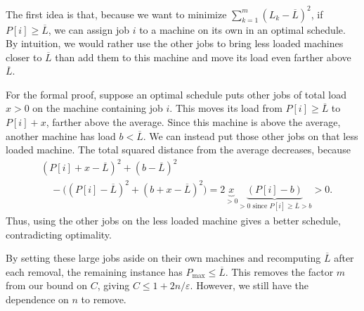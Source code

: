 \documentclass[12pt,a4paper]{article}
\begin{document}
The first idea is that, because we want to minimize
$\sum_{k=1}^{m}(L_k-\overline{L})^2$,
if $P[i]\geq\overline{L}$, we can assign
job $i$ to a machine on its own in an optimal schedule. By intuition, we
would rather use the other jobs to bring less loaded machines closer to
$\overline{L}$ than add them to this machine and move its load even
farther above $\overline{L}$.

For the formal proof, suppose an optimal schedule puts other jobs of
total load $x>0$ on the machine containing job $i$. This moves its load
from $P[i]\geq\overline{L}$ to $P[i]+x$, farther above the average.
Since this machine is above the average, another machine has load
$b<\overline{L}$. We can instead put those other jobs on that less loaded
machine. The total squared distance from the average decreases, because
\[
\begin{aligned}
&(P[i]+x-\overline{L})^2+(b-\overline{L})^2\\
&\quad-\bigl((P[i]-\overline{L})^2+(b+x-\overline{L})^2\bigr)
=2\underbrace{x}_{>0}\underbrace{(P[i]-b)}_{>0\text{ since }P[i]\geq\overline{L}>b}>0.
\end{aligned}
\]
Thus, using the other jobs on the less loaded machine gives a better
schedule, contradicting optimality.

By setting these large jobs aside on their own machines and recomputing
$\overline{L}$ after each removal, the remaining instance has
$P_{\max}\leq\overline{L}$. This removes the factor $m$ from our bound on
$C$, giving $C\leq1+2n/\varepsilon$. However, we still have the dependence
on $n$ to remove.
\end{document}
